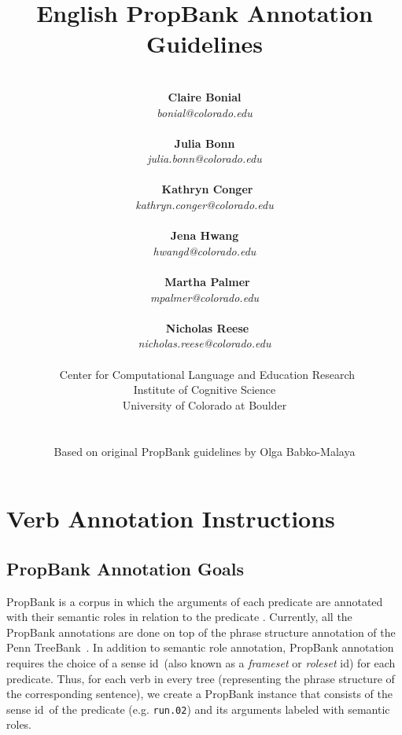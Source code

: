 \documentclass[11pt]{report}
\newcommand{\id}{{\sc id}}
\begin{document}
\title{
\textbf{English PropBank Annotation Guidelines}
 }
\author{\\
\textbf{Claire Bonial}\\
\textit{bonial@colorado.edu}\\\\
\textbf{Julia Bonn}\\
\textit{julia.bonn@colorado.edu}\\\\\
\textbf{Kathryn Conger}\\
\textit{kathryn.conger@colorado.edu}\\\\
\textbf{Jena Hwang}\\
\textit{hwangd@colorado.edu}\\\\\
\textbf{Martha Palmer}\\
\textit{mpalmer@colorado.edu}\\\\\
\textbf{Nicholas Reese}\\
\textit{nicholas.reese@colorado.edu}\\\\\
Center for Computational Language and Education Research \\
Institute of Cognitive Science \\
University of Colorado at Boulder \\\\\\
Based on original PropBank guidelines by Olga Babko-Malaya}

\maketitle
\pagebreak

\tableofcontents
\pagebreak

\chapter{Verb Annotation Instructions}
\section{PropBank Annotation Goals}
\label{ssec: Argroles}

PropBank is a corpus in which the arguments of each predicate are annotated with their semantic roles in relation to the predicate \cite{palmer-05a}.  Currently, all the PropBank annotations are done on top of the phrase structure annotation of the Penn TreeBank~\cite{marcus-93a}.  In addition to semantic role annotation, PropBank annotation requires the choice of a sense \id\ (also known as a \textit{frameset} or \textit{roleset} \id) for each predicate.  Thus, for each verb in every tree (representing the phrase structure of the corresponding sentence), we create a PropBank instance that consists of the sense \id\ of the predicate (e.g. {\tt run.02}) and its arguments labeled with semantic roles.  
\end{document}
